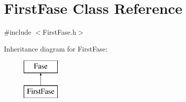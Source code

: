\hypertarget{class_first_fase}{}\section{First\+Fase Class Reference}
\label{class_first_fase}


{\ttfamily \#include $<$First\+Fase.\+h$>$}

Inheritance diagram for First\+Fase\+:\begin{figure}[H]
\begin{center}
\leavevmode
\includegraphics[height=2.000000cm]{class_first_fase}
\end{center}
\end{figure}
